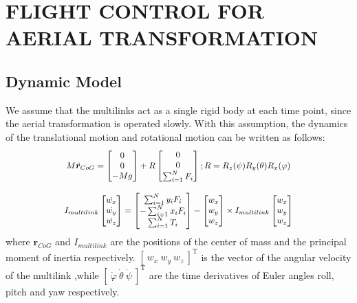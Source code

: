 \section{FLIGHT CONTROL FOR AERIAL TRANSFORMATION}

\subsection{Dynamic Model}
We assume that the multilinks act as a single rigid body at each time point, since the aerial transformation is operated slowly. With this assumption, the dynamics of the translational motion and rotational motion can be written as follows:
\begin{equation}
  \scalebox{0.9}{$
  M\ddot{\bm{r}}_{CoG}=
  \begin{bmatrix}
    0 \\
    0 \\
    -Mg
  \end{bmatrix}
  +R
  \begin{bmatrix}
    0 \\
    0 \\
    \sum^{N}_{i=1}F_{i}
  \end{bmatrix}
  ; \\
  R=R_{z}(\psi)R_{y}(\theta)R_{x}(\varphi) 
  $}
  \label{eq:translation_motioneq}
\end{equation}

\begin{equation}
  \scalebox{0.9}{$
  I_{multilink}
  \begin{bmatrix}
    \dot{w_x} \\
    \dot{w_y} \\
    \dot{w_z}
  \end{bmatrix}
  =
  \begin{bmatrix}
    \sum^{N}_{i=1} y_{i}F_{i} \\
    -\sum^{N}_{i=1} x_{i}F_{i} \\
    \sum^{N}_{i=1} T_{i}
  \end{bmatrix}
  -
  \begin{bmatrix}
    w_x \\
    w_y \\
    w_z
  \end{bmatrix}
  \times I_{multilink}
  \begin{bmatrix}
    w_x \\
    w_y \\
    w_z
  \end{bmatrix}
  $}
  \label{eq:rotation_motioneq}
\end{equation}
where $\bm{r}_{CoG}$ and $I_{multilink}$ are the positions of the center of mass and the principal moment of inertia respectively. $[ \ w_x \ w_y \ w_z \ ]^\mathrm{T}$ is the vector of the angular velocity of the multilink ,while $[ \ \dot{\varphi} \ \dot{\theta} \ \dot{\psi} \ ]^\mathrm{T}$ are the time derivatives of Euler angles roll, pitch and yaw respectively.


